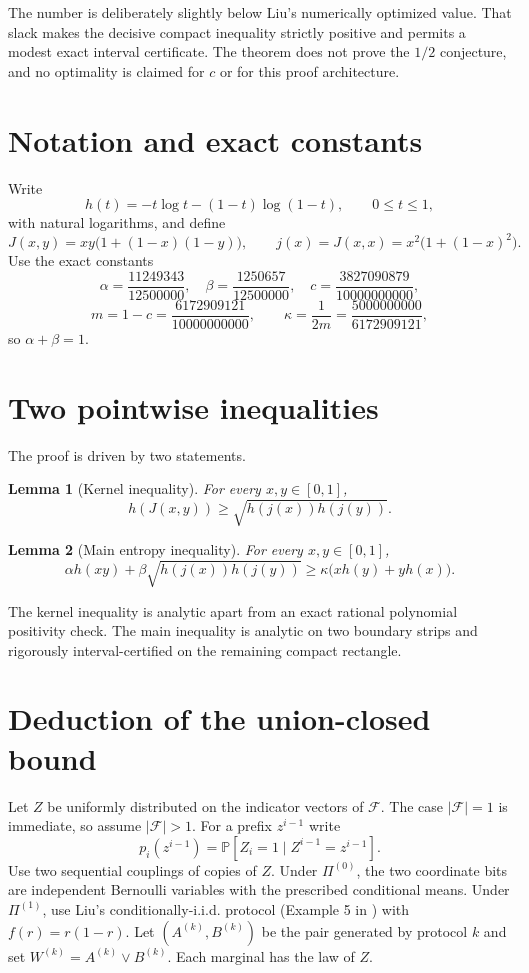 \documentclass[11pt]{article}
\newtheorem{lemma}{Lemma}
\newcommand{\F}{\mathcal F}
\newcommand{\Prb}{\mathbb P}
\begin{document}
The number is deliberately slightly below Liu's numerically optimized value.
That slack makes the decisive compact inequality strictly positive and permits
a modest exact interval certificate. The theorem does not prove the $1/2$
conjecture, and no optimality is claimed for $c$ or for this proof architecture.

\section{Notation and exact constants}

Write
\[
h(t)=-t\log t-(1-t)\log(1-t),\qquad 0\le t\le1,
\]
with natural logarithms, and define
\[
J(x,y)=xy\bigl(1+(1-x)(1-y)\bigr),\qquad
j(x)=J(x,x)=x^2\bigl(1+(1-x)^2\bigr).
\]
Use the exact constants
\[
\alpha=\frac{11249343}{12500000},\quad
\beta=\frac{1250657}{12500000},\quad
c=\frac{3827090879}{10000000000},
\]
\[
m=1-c=\frac{6172909121}{10000000000},\qquad
\kappa=\frac1{2m}=\frac{5000000000}{6172909121},
\]
so $\alpha+\beta=1$.

\section{Two pointwise inequalities}

The proof is driven by two statements.

\begin{lemma}[Kernel inequality]\label{lem:kernel}
For every $x,y\in[0,1]$,
\[
h(J(x,y))\ge\sqrt{h(j(x))h(j(y))}.
\]
\end{lemma}

\begin{lemma}[Main entropy inequality]\label{lem:mainineq}
For every $x,y\in[0,1]$,
\[
\alpha h(xy)+\beta\sqrt{h(j(x))h(j(y))}
\ge\kappa\bigl(xh(y)+yh(x)\bigr).
\]
\end{lemma}

The kernel inequality is analytic apart from an exact rational polynomial
positivity check. The main inequality is analytic on two boundary strips and
rigorously interval-certified on the remaining compact rectangle.

\section{Deduction of the union-closed bound}\label{sec:deduction}

Let $Z$ be uniformly distributed on the indicator vectors of $\F$. The case
$|\F|=1$ is immediate, so assume $|\F|>1$. For a prefix $z^{i-1}$ write
\[
p_i(z^{i-1})=\Prb[Z_i=1\mid Z^{i-1}=z^{i-1}].
\]
Use two sequential couplings of copies of $Z$. Under $\Pi^{(0)}$, the two
coordinate bits are independent Bernoulli variables with the prescribed
conditional means. Under $\Pi^{(1)}$, use Liu's conditionally-i.i.d. protocol
(Example 5 in \cite{Liu2023}) with $f(r)=r(1-r)$. Let
$(A^{(k)},B^{(k)})$ be the pair generated by protocol $k$ and set
$W^{(k)}=A^{(k)}\vee B^{(k)}$. Each marginal has the law of $Z$.
\end{document}
